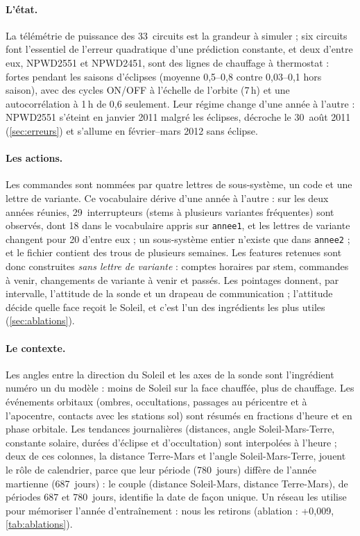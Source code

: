 \documentclass[11pt,a4paper]{article}
\begin{document}
\paragraph{L'état.} La télémétrie de puissance des 33~circuits est la grandeur à simuler ; six circuits font l'essentiel de l'erreur quadratique d'une prédiction constante, et deux d'entre eux, NPWD2551 et NPWD2451, sont des lignes de chauffage à thermostat : fortes pendant les saisons d'éclipses (moyenne 0,5--0,8 contre 0,03--0,1 hors saison), avec des cycles ON/OFF à l'échelle de l'orbite (7\,h) et une autocorrélation à 1\,h de 0,6 seulement. Leur régime change d'une année à l'autre : NPWD2551 s'éteint en janvier 2011 malgré les éclipses, décroche le 30~août 2011 (\autoref{sec:erreurs}) et s'allume en février--mars 2012 sans éclipse.

\paragraph{Les actions.} Les commandes sont nommées par quatre lettres de sous-système, un code et une lettre de variante. Ce vocabulaire dérive d'une année à l'autre : sur les deux années réunies, 29~interrupteurs (stems à plusieurs variantes fréquentes) sont observés, dont 18 dans le vocabulaire appris sur \texttt{annee1}, et les lettres de variante changent pour 20 d'entre eux ; un sous-système entier n'existe que dans \texttt{annee2} ; et le fichier contient des trous de plusieurs semaines. Les features retenues sont donc construites \emph{sans lettre de variante} : comptes horaires par stem, commandes à venir, changements de variante à venir et passés. Les pointages donnent, par intervalle, l'attitude de la sonde et un drapeau de communication ; l'attitude décide quelle face reçoit le Soleil, et c'est l'un des ingrédients les plus utiles (\autoref{sec:ablations}).

\paragraph{Le contexte.} Les angles entre la direction du Soleil et les axes de la sonde sont l'ingrédient numéro un du modèle : moins de Soleil sur la face chauffée, plus de chauffage. Les événements orbitaux (ombres, occultations, passages au péricentre et à l'apocentre, contacts avec les stations sol) sont résumés en fractions d'heure et en phase orbitale. Les tendances journalières (distances, angle Soleil-Mars-Terre, constante solaire, durées d'éclipse et d'occultation) sont interpolées à l'heure ; deux de ces colonnes, la distance Terre-Mars et l'angle Soleil-Mars-Terre, jouent le rôle de calendrier, parce que leur période (780~jours) diffère de l'année martienne (687~jours) : le couple (distance Soleil-Mars, distance Terre-Mars), de périodes 687 et 780~jours, identifie la date de façon unique. Un réseau les utilise pour mémoriser l'année d'entraînement : nous les retirons (ablation : +0,009, \autoref{tab:ablations}).
\end{document}
